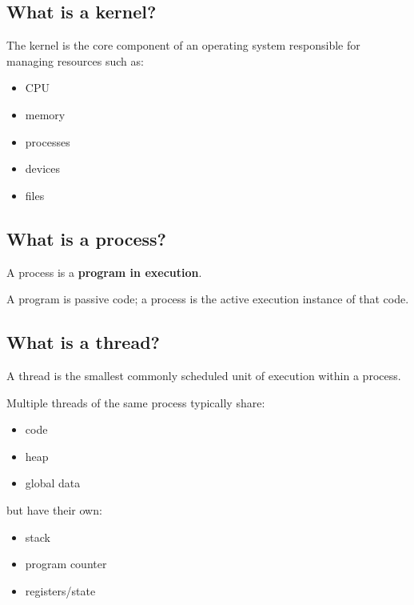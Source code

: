 \medskip

\subsection{What is a kernel?}

The kernel is the core component of an operating system responsible for managing resources such as:

\begin{itemize}
  \item CPU
  \item memory
  \item processes
  \item devices
  \item files
\end{itemize}

\medskip

\subsection{What is a process?}

A process is a \textbf{program in execution}.

A program is passive code; a process is the active execution instance of that code.

\medskip

\subsection{What is a thread?}

A thread is the smallest commonly scheduled unit of execution within a process.

Multiple threads of the same process typically share:

\begin{itemize}
  \item code
  \item heap
  \item global data
\end{itemize}

but have their own:

\begin{itemize}
  \item stack
  \item program counter
  \item registers/state
\end{itemize}

\medskip


